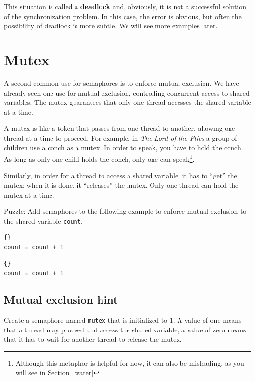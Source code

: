 \documentclass{book}
\newcommand{\clearemptydoublepage}{\newpage\cleardoublepage}
\begin{document}
This situation is called a {\bf deadlock} and, obviously, it is
not a successful solution of the synchronization problem.  In
this case, the error is obvious, but often the possibility of
deadlock is more subtle.  We will see more examples later.


\section{Mutex}

A second common use for semaphores is to enforce mutual exclusion.
We have already seen one use for mutual exclusion, controlling
concurrent access to shared variables.  The mutex guarantees
that only one thread accesses the shared variable at a time.

A mutex is like a token that passes from one thread to another,
allowing one thread at a time to proceed.  For example, in {\em The
Lord of the Flies} a group of children use a conch as a mutex.  In
order to speak, you have to hold the conch.  As long as only one child
holds the conch, only one can speak\footnote{Although this metaphor
is helpful for now, it can also be misleading, as you will see in
Section~\ref{water}}.

Similarly, in order for a thread to access a shared variable,
it has to ``get'' the mutex; when it is done, it ``releases''
the mutex.  Only one thread can hold the mutex at a time.

Puzzle: Add semaphores to the following example to
enforce mutual exclusion to the shared variable {\tt count}.

\begin{minipage}[t]{2in}
\begin{lstlisting}[title={Thread A}]{}
count = count + 1
\end{lstlisting}
\end{minipage}
\hfill
\begin{minipage}[t]{2in}
\begin{lstlisting}[title={Thread B}]{}
count = count + 1
\end{lstlisting}
\end{minipage}


\clearemptydoublepage
\subsection{Mutual exclusion hint}

Create a semaphore named {\tt mutex} that is initialized
to 1.  A value of one means that a thread may proceed and
access the shared variable; a value of zero means that it
has to wait for another thread to release the mutex.
\end{document}
